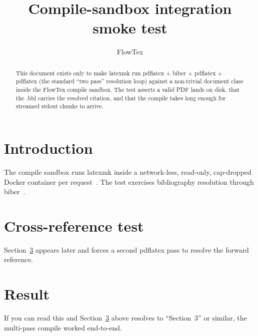 \documentclass{IEEEtran}
\title{Compile-sandbox integration smoke test}
\author{FlowTex}
\begin{document}
\maketitle

\begin{abstract}
This document exists only to make latexmk run pdflatex + biber +
pdflatex + pdflatex (the standard ``two pass'' resolution loop)
against a non-trivial document class inside the FlowTex compile
sandbox. The test asserts a valid PDF lands on disk, that the
.bbl carries the resolved citation, and that the compile takes
long enough for streamed stdout chunks to arrive.
\end{abstract}

\section{Introduction}
The compile sandbox runs latexmk inside a network-less, read-only,
cap-dropped Docker container per request~\cite{turing1936}. The
test exercises bibliography resolution
through biber~\cite{lamport1986}.

\section{Cross-reference test}
Section~\ref{sec:result} appears later and forces a second pdflatex
pass to resolve the forward reference.

\section{Result}\label{sec:result}
If you can read this and Section~\ref{sec:result} above resolves to
``Section~3'' or similar, the multi-pass compile worked end-to-end.

\printbibliography
\end{document}

